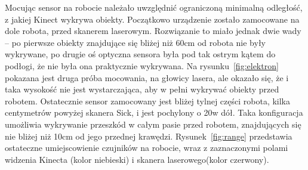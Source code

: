 Mocując sensor na robocie należało uwzględnić ograniczoną minimalną odległość,
z jakiej Kinect wykrywa obiekty. Początkowo urządzenie zostało zamocowane na
dole robota, przed skanerem laserowym. Rozwiązanie to miało jednak dwie wady --
po pierwsze obiekty znajdujące się bliżej niż 60cm od robota nie były
wykrywane, po drugie oś optyczna sensora była pod tak ostrym kątem do podłogi,
że nie była ona praktycznie wykrywana. Na rysunku~\ref{fig:elektron} pokazana
jest druga próba mocowania, na głowicy lasera, ale okazało się, że i taka
wysokość nie jest wystarczająca, aby w pełni wykrywać obiekty przed robotem.
Ostatecznie sensor zamocowany jest bliżej tylnej części robota, kilka
centymetrów powyżej skanera Sick, i jest pochylony o 20\textdegree w dół. Taka
konfiguracja umożliwia wykrywanie przeszkód w całym pasie przed robotem,
znajdujących się nie bliżej niż 10cm od jego przednej krawędzi.
Rysunek~\ref{fig:range} przedstawia ostateczne umiejscowienie czujników
na robocie, wraz z zaznaczonymi polami widzenia Kinecta (kolor niebieski) i
skanera laserowego(kolor czerwony).



